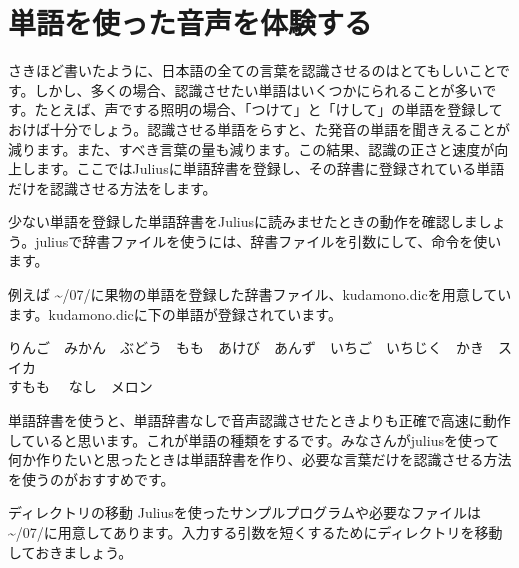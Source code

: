 \documentclass[text06.tex]{subfiles}
\begin{document}
\newpage
\section{単語を使った音声を体験する}
さきほど書いたように、日本語の全ての言葉を認識させるのはとてもしいことです。しかし、多くの場合、認識させたい単語はいくつかにられることが多いです。たとえば、声でする照明の場合、「つけて」と「けして」の単語を登録しておけば十分でしょう。認識させる単語をらすと、た発音の単語を聞きえることが減ります。また、すべき言葉の量も減ります。この結果、認識の正さと速度が向上します。ここではJuliusに単語辞書を登録し、その辞書に登録されている単語だけを認識させる方法をします。

少ない単語を登録した単語辞書をJuliusに読みませたときの動作を確認しましょう。juliusで辞書ファイルを使うには、辞書ファイルを引数にして、命令を使います。\\

例えば \textasciitilde /07/に果物の単語を登録した辞書ファイル、kudamono.dicを用意しています。kudamono.dicに下の単語が登録されています。
\begin{center}
	りんご　みかん　ぶどう　もも　あけび　あんず　いちご　いちじく　かき　スイカ\\すもも　	なし　メロン
\end{center}

単語辞書を使うと、単語辞書なしで音声認識させたときよりも正確で高速に動作していると思います。これが単語の種類をするです。みなさんがjuliusを使って何か作りたいと思ったときは単語辞書を作り、必要な言葉だけを認識させる方法を使うのがおすすめです。\\

\begin{itembox}[c]{ディレクトリの移動}
        Juliusを使ったサンプルプログラムや必要なファイルは \textasciitilde /07/に用意してあります。入力する引数を短くするためにディレクトリを移動しておきましょう。\\
\end{itembox}

\begin{tcolorbox}[title=\useOmetoi]
\begin{enumerate}
\end{enumerate}
\end{tcolorbox}
\end{document}
